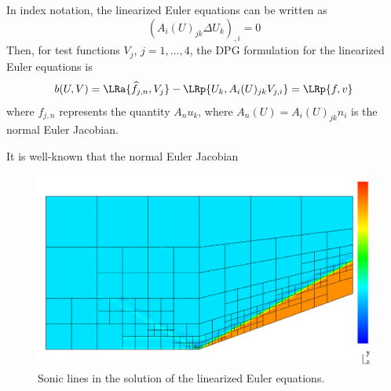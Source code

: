 In index notation, the linearized Euler equations can be written as
\[
\left(A_{i}(U)_{jk}\Delta U_k\right)_{,i} = 0
\]
Then, for test functions $V_j$, $j = 1,\ldots, 4$, the DPG formulation for the linearized Euler equations is 
\[
b(U,V) = \LRa{\widehat{f}_{j,n}, V_j} - \LRp{U_k,A_{i}(U)_{jk} V_{j,i}} = \LRp{f,v}
\]
where $f_{j,n}$ represents the quantity $A_n u_k$, where $A_n(U) = A_i(U)_{jk}n_i$ is the normal Euler Jacobian.

It is well-known that the normal Euler Jacobian


\begin{figure}[!h]
\centering
\includegraphics[scale = .5]{figs/sonicLines.pdf}
\caption{Sonic lines in the solution of the linearized Euler equations.}
\label{fig:linEulerResults}
\end{figure}
